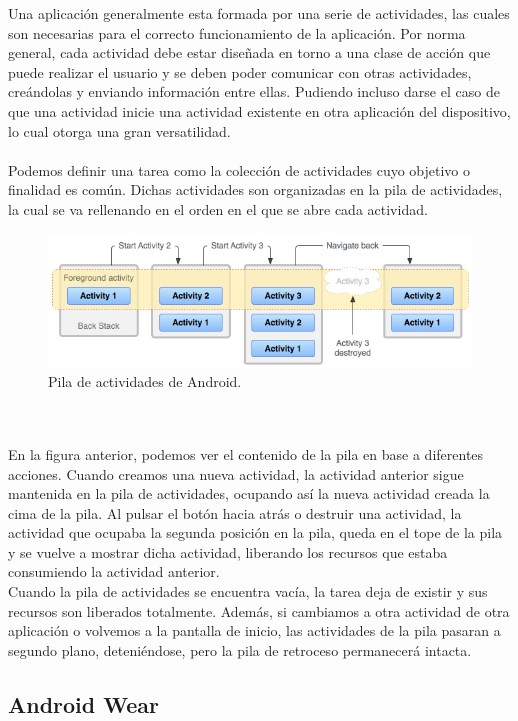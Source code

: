 Una aplicación generalmente esta formada por una serie de actividades, las cuales son necesarias para el correcto funcionamiento de la aplicación. Por norma general, cada actividad debe estar diseñada en torno a una clase de acción que puede realizar el usuario y se deben poder comunicar con otras actividades, creándolas y enviando información entre ellas. Pudiendo incluso darse el caso de que una actividad inicie una actividad existente en otra aplicación del dispositivo, lo cual otorga una gran versatilidad.
\\
\\
Podemos definir una tarea como la colección de actividades cuyo objetivo o finalidad es común. Dichas actividades son organizadas en la pila de actividades, la cual se va rellenando en el orden en el que se abre cada actividad.
\begin{figure}[H]
	\centering
	\includegraphics[width=\textwidth]{imagenes/activityStack.png}
	\caption{Pila de actividades de Android.}
	\label{Pila de avtividades}
\end{figure}
\\
\\
En la figura anterior, podemos ver el contenido de la pila en base a diferentes acciones. Cuando creamos una nueva actividad, la actividad anterior sigue mantenida en la pila de actividades, ocupando así la nueva actividad creada la cima de la pila. Al pulsar el botón hacia atrás o destruir una actividad, la actividad que ocupaba la segunda posición en la pila, queda en el tope de la pila y se vuelve a mostrar dicha actividad, liberando los recursos que estaba consumiendo la actividad anterior.
\\
Cuando la pila de actividades se encuentra vacía, la tarea deja de existir y sus recursos son liberados totalmente. Además, si cambiamos a otra actividad de otra aplicación o volvemos a la pantalla de inicio, las actividades de la pila pasaran a segundo plano, deteniéndose, pero la pila de retroceso permanecerá intacta.
\subsection{Android Wear}

